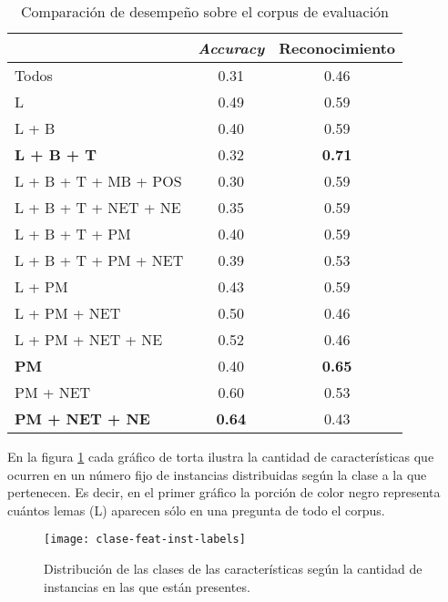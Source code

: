 \begin{table}[h!]
\centering
\begin{tabular}{l c c}
     & \textit{Accuracy} & Reconocimiento \\ [0.5ex]
    \hline
    Todos & 0.31 & 0.46 \\[0.5ex]
    L & 0.49 & 0.59 \\ [0.5ex]
    L + B & 0.40 & 0.59 \\ [0.5ex]
    \textbf{L + B + T} & 0.32 & \textbf{0.71} \\[0.5ex]
    L + B + T + MB + POS & 0.30 & 0.59 \\[0.5ex]
    L + B + T + NET + NE & 0.35 & 0.59 \\[0.5ex]
    L + B + T + PM & 0.40 & 0.59 \\[0.5ex]
    L + B + T + PM + NET & 0.39 & 0.53 \\[0.5ex]
    L + PM & 0.43 & 0.59 \\[0.5ex]
    L + PM + NET & 0.50 & 0.46 \\[0.5ex]
    L + PM + NET + NE & 0.52 & 0.46 \\[0.5ex]
    \textbf{PM} & 0.40 & \textbf{0.65} \\[0.5ex]
    PM + NET & 0.60 & 0.53 \\[0.5ex]
    \textbf{PM + NET + NE} & \textbf{0.64} & 0.43 \\[0.5ex]
    \hline
\end{tabular}
\caption{Comparación de desempeño sobre el corpus de evaluación}\label{tabla-exp3}
\end{table}

En la figura \ref{fig-distribucion-features} cada gráfico de torta ilustra la cantidad de características que ocurren en un número fijo de instancias distribuidas según la clase a la que pertenecen. Es decir, en el primer gráfico la porción de color negro representa cuántos lemas (L) aparecen sólo en una pregunta de todo el corpus.

\begin{figure}[h!]
\centering
\texttt{[image: clase-feat-inst-labels]}
\caption{Distribución de las clases de las características según la cantidad de instancias en las que están presentes.}\label{fig-distribucion-features}
\end{figure}

\vspace{3 mm}

